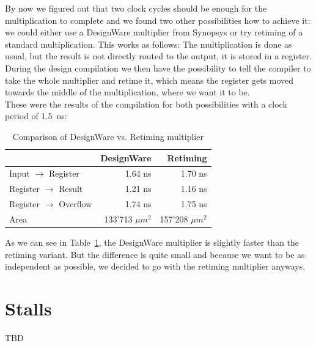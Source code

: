 By now we figured out that two clock cycles should be enough for the multiplication to complete and we found two other possibilities how to achieve it: we could either use a DesignWare multiplier from Synopsys or try retiming of a standard multiplication. This works as follows: The multiplication is done as usual, but the result is not directly routed to the output, it is stored in a register. During the design compilation we then have the possibility to tell the compiler to take the whole multiplier and retime it, which means the register gets moved towards the middle of the multiplication, where we want it to be.\\
These were the results of the compilation for both possibilities with a clock period of 1.5~ns:

\begin{table}[htbp]
 \caption{Comparison of DesignWare vs. Retiming multiplier}
 \label{tab:designware}
 \centering
 
 \begin{tabular}{|l|r|r|}
  \hline
  & DesignWare & Retiming \\
  \hline
  Input $\to$ Register & 1.64 ns & 1.70 ns \\
  Register $\to$ Result & 1.21 ns & 1.16 ns \\
  Register $\to$ Overflow & 1.74 ns & 1.75 ns \\
  \hline
  Area & 133'713 $\mu m^2$ & 157'208 $\mu m^2$ \\
  \hline
 \end{tabular}
 
\end{table}

As we can see in Table~\ref{tab:designware}, the DesignWare multiplier is slightly faster than the retiming variant. But the difference is quite small and because we want to be as independent as possible, we decided to go with the retiming multiplier anyways.

\section{Stalls}
TBD
